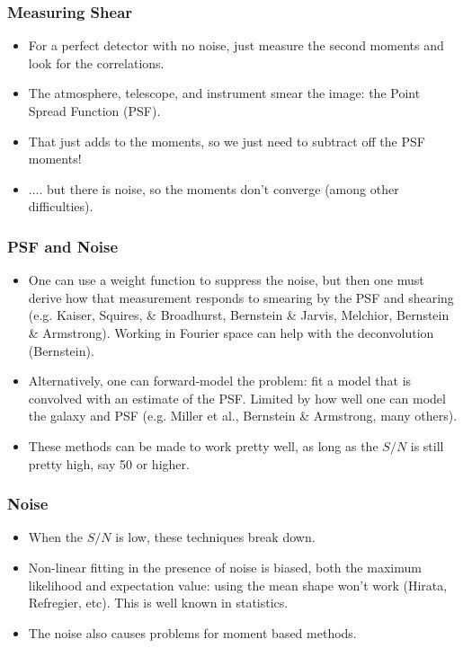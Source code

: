 \documentclass{beamer}
\begin{document}
\frame
{
    \frametitle{Measuring Shear}

    \begin{itemize}
        \item For a perfect detector with no noise, just measure
            the second moments and look for the correlations.
        \item The atmosphere, telescope, and instrument smear
            the image: the Point Spread Function (PSF).
        \item That just adds to the moments, so we just need to
            subtract off the PSF moments!
        \item .... but there is noise, so the moments don't converge (among
            other difficulties).
    \end{itemize}
}

\frame
{
    \frametitle{PSF and Noise}
    
    \begin{itemize}

        \item One can use a weight function to suppress the noise, but then one
            must derive how that measurement responds to smearing by the PSF
            and shearing (e.g. Kaiser, Squires, \& Broadhurst, Bernstein \& Jarvis, Melchior,
                    Bernstein \& Armstrong).  Working in Fourier space can help
            with the deconvolution (Bernstein).

        \item Alternatively, one can forward-model the problem: fit a model that is
            convolved with an estimate of the PSF.  Limited by how well one can
            model the galaxy and PSF (e.g. Miller et al., Bernstein \& Armstrong, many
            others).

        \item These methods can be made to work pretty well, as long as
            the $S/N$ is still pretty high, say 50 or higher.

    \end{itemize}
}

\frame
{
    \frametitle{Noise}

    \begin{itemize}
        \item When the $S/N$ is low, these techniques break down.
        \item Non-linear fitting in the presence of noise is biased, both
            the maximum likelihood and expectation value: using the mean
            shape won't work (Hirata, Refregier, etc).  This is well 
            known in statistics. 
        \item The noise also causes problems for moment based methods.
    \end{itemize}
}
\end{document}
